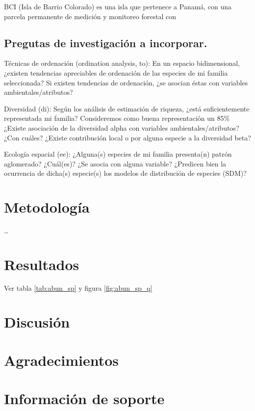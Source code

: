 \documentclass[11pt,]{article}
\begin{document}
BCI (Isla de Barrio Colorado) es una isla que pertenece a Panamá, con
una parcela permanente de medición y monitoreo forestal con

\subsection{Pregutas de investigación a
incorporar.}\label{pregutas-de-investigaciuxf3n-a-incorporar.}

Técnicas de ordenación (ordination analysis, to): En un espacio
bidimensional, ¿existen tendencias apreciables de ordenación de las
especies de mi familia seleccionada? Si existen tendencias de
ordenación, ¿se asocian éstas con variables ambientales/atributos?

Diversidad (di): Según los análisis de estimación de riqueza, ¿está
suficientemente representada mi familia? Consideremos como buena
representación un 85\% ¿Existe asociación de la diversidad alpha con
variables ambientales/atributos? ¿Con cuáles? ¿Existe contribución local
o por alguna especie a la diversidad beta?

Ecología espacial (ee): ¿Alguna(s) especies de mi familia presenta(n)
patrón aglomerado? ¿Cuál(es)? ¿Se asocia con alguna variable? ¿Predicen
bien la ocurrencia de dicha(s) especie(s) los modelos de distribución de
especies (SDM)?

\section{Metodología}\label{metodologuxeda}

\ldots

\section{Resultados}\label{resultados}

Ver tabla \ref{tab:abun_sp} y figura \ref{fig:abun_sp_q}

\section{Discusión}\label{discusiuxf3n}

\section{Agradecimientos}\label{agradecimientos}

\section{Información de soporte}\label{informaciuxf3n-de-soporte}
\end{document}
